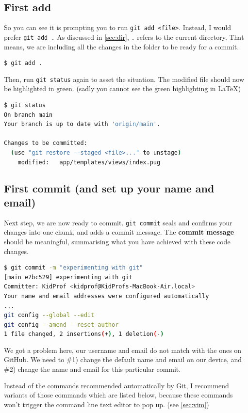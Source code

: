 \subsection*{First add}
So you can see it is prompting you to run \texttt{git add <file>}. Instead, I would prefer \texttt{git add .} As discussed in \cref{sec:dir}, \texttt{.} refers to the current directory. That means, we are including all the changes in the folder to be ready for a commit.

\begin{lstlisting}[language=bash]
$ git add .
\end{lstlisting}

Then, run \texttt{git status} again to asset the situation. The modified file should now be highlighted in green. (sadly you cannot see the green highlighting in LaTeX)

\begin{lstlisting}[language=bash]
$ git status
On branch main
Your branch is up to date with 'origin/main'.

Changes to be committed:
  (use "git restore --staged <file>..." to unstage)
	modified:   app/templates/views/index.pug
\end{lstlisting}

\subsection*{First commit (and set up your name and email)}

Next step, we are now ready to commit. \texttt{git commit} seals and confirms your changes into one chunk, and adds a commit message. The \textbf{commit message} should be meaningful, summarising what you have achieved with these code changes.

\begin{lstlisting}[language=bash]
$ git commit -m "experimenting with git"
[main e7bc529] experimenting with git
Committer: KidProf <kidprof@KidProfs-MacBook-Air.local>
Your name and email addresses were configured automatically
...
git config --global --edit
git config --amend --reset-author
1 file changed, 2 insertions(+), 1 deletion(-)
\end{lstlisting}

We got a problem here, our username and email do not match with the ones on GitHub. We need to \#1) change the default name and email on our device, and \#2) change the name and email for this particular commit.

Instead of the commands recommended automatically by Git, I recommend variants of those commands which are listed below, because these commands won't trigger the command line text editor to pop up. (see \cref{sec:vim})

